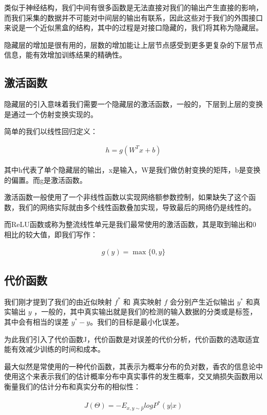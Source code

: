 类似于神经结构，我们中间有很多函数是无法直接对我们的输出产生直接的影响，而我们采集的数据并不可能对中间层的输出有联系，因此这些对于我们的外围接口来说是一个近似黑盒的结构，其中的过程是对接口隐藏的，我们将其称为隐藏层。

隐藏层的增加是很有用的，层数的增加能让上层节点感受到更多更复杂的下层节点信息，能有效增加训练结果的精确性。

\subsection{激活函数}

隐藏层的引入意味着我们需要一个隐藏层的激活函数，一般的，下层到上层的变换是通过一个仿射变换实现的。

简单的我们以线性回归定义：

\begin{eqnarray}
    h = g(W^Tx+b)
\end{eqnarray}

其中h代表了单个隐藏层的输出，x是输入，W是我们做仿射变换的矩阵，b是变换的偏置。而g是激活函数。

激活函数一般使用了一个非线性函数以实现网络额参数控制，如果缺失了这个函数，我们的网络实际就由多个线性函数叠加实现，导致最后的网络仍是线性的。

而ReLU函数或称为整流线性单元是我们最常使用的激活函数，其是取到输出和0相比的较大值，即我们写作：

\begin{eqnarray}
    g(y) = \max \lbrace 0,y \rbrace
\end{eqnarray}

\subsection{代价函数}

我们刚才提到了我们的由近似映射 $ f^{\ast} $ 和 真实映射 $ f $ 会分别产生近似输出 $ y^{\ast} $ 和真实输出 $ y $ ，一般的，其中真实输出就是我们的检测的输入数据的分类或是标签，其中会有相当的误差 $ y^{\ast} - y $。我们的目标是最小化误差。

为此我们引入了代价函数J，代价函数是对误差的代价分析，代价函数的选取适宜能有效减少训练的时间和成本。

最大似然是常使用的一种代价函数，其表示为概率分布的负对数，香农的信息论中使用这个来表示我们的估计概率分布中真实事件的发生概率，交叉熵损失函数用以衡量我们的估计分布和真实分布的相似性：

\begin{eqnarray}
    J(\Theta) = - E_{x,y \sim \hat{p}}logP^{\ast}(y|x)
\end{eqnarray}

